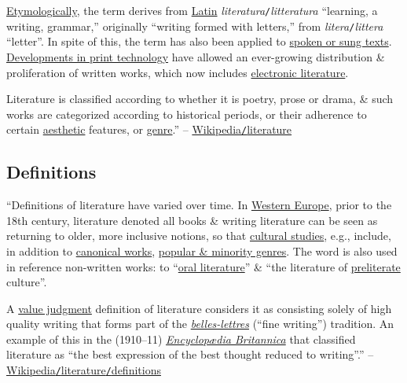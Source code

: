 \documentclass[oneside]{book}
\numberwithin{equation}{section}
\begin{document}
\href{https://en.wikipedia.org/wiki/Etymology}{Etymologically}, the term derives from \href{https://en.wikipedia.org/wiki/Latin_language}{Latin} \textit{literatura}\texttt{/}\textit{litteratura} ``learning, a writing, grammar,'' originally ``writing formed with letters,'' from \textit{litera}\texttt{/}\textit{littera} ``letter''. In spite of this, the term has also been applied to \href{https://en.wikipedia.org/wiki/Oral_literature}{spoken or sung texts}. \href{https://en.wikipedia.org/wiki/History_of_printing}{Developments in print technology} have allowed an ever-growing distribution \& proliferation of written works, which now includes \href{https://en.wikipedia.org/wiki/Electronic_literature}{electronic literature}.

Literature is classified according to whether it is poetry, prose or drama, \& such works are categorized according to historical periods, or their adherence to certain \href{https://en.wikipedia.org/wiki/Aesthetics}{aesthetic} features, or \href{https://en.wikipedia.org/wiki/Genre}{genre}.'' -- \href{https://en.wikipedia.org/wiki/Literature}{Wikipedia\texttt{/}literature}

\subsection{Definitions}
``Definitions of literature have varied over time. In \href{https://en.wikipedia.org/wiki/Western_Europe}{Western Europe}, prior to the 18th century, literature denoted all books \& writing literature can be seen as returning to older, more inclusive notions, so that \href{https://en.wikipedia.org/wiki/Cultural_studies}{cultural studies}, e.g., include, in addition to \href{https://en.wikipedia.org/wiki/Western_canon}{canonical works}, \href{https://en.wikipedia.org/wiki/Genre_fiction}{popular \& minority genres}. The word is also used in reference non-written works: to ``\href{https://en.wikipedia.org/wiki/Oral_literature}{oral literature}'' \& ``the literature of \href{https://en.wikipedia.org/wiki/Preliterate}{preliterate} culture''.

A \href{https://en.wikipedia.org/wiki/Value_judgment}{value judgment} definition of literature considers it as consisting solely of high quality writing that forms part of the \href{https://en.wikipedia.org/wiki/Belles-lettres}{\textit{belles-lettres}} (``fine writing'') tradition. An example of this in the (1910--11) \href{https://en.wikipedia.org/wiki/Encyclopedia_Britannica_Eleventh_Edition}{\textit{Encyclop\ae dia Britannica}} that classified literature as ``the best expression of the best thought reduced to writing''.'' -- \href{https://en.wikipedia.org/wiki/Literature#Definitions}{Wikipedia\texttt{/}literature\texttt{/}definitions}
\end{document}
